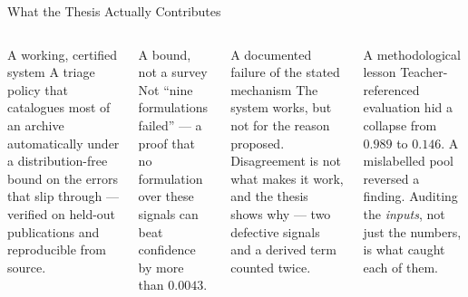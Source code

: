 \documentclass[aspectratio=169,11pt]{beamer}
\begin{document}
\begin{frame}{What the Thesis Actually Contributes}
\begin{columns}[T]
\begin{exampleblock}{\small A working, certified system}
\footnotesize A triage policy that catalogues most of an archive automatically under a distribution-free bound on the errors that slip through --- verified on held-out publications and reproducible from source.
\end{exampleblock}
\vspace{1mm}
\begin{exampleblock}{\small A bound, not a survey}
\footnotesize Not ``nine formulations failed'' --- a proof that no formulation over these signals can beat confidence by more than $0.0043$.
\end{exampleblock}

\begin{block}{\small A documented failure of the stated mechanism}
\footnotesize The system works, but not for the reason proposed. Disagreement is not what makes it work, and the thesis shows why --- two defective signals and a derived term counted twice.
\end{block}
\vspace{1mm}
\begin{block}{\small A methodological lesson}
\footnotesize Teacher-referenced evaluation hid a collapse from $0.989$ to $0.146$. A mislabelled pool reversed a finding. Auditing the \emph{inputs}, not just the numbers, is what caught each of them.
\end{block}
\end{columns}
\end{frame}
\end{document}
